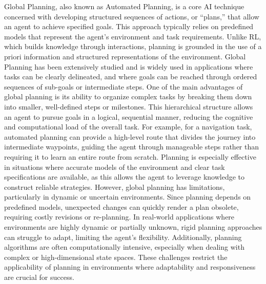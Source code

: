Global Planning, also known as Automated Planning, is a core AI technique concerned with developing structured
sequences of actions, or “plans,” that allow an agent to achieve specified goals.  %
This approach typically relies on predefined models that represent the agent’s environment and task requirements.
Unlike RL, which builds knowledge through interactions, planning is grounded in the use of a priori information and
structured representations of the environment.
Global Planning has been extensively studied and is widely used in applications where tasks can be clearly delineated,
and where goals can be reached through ordered sequences of sub-goals or intermediate steps.  %
One of the main advantages of global planning is its ability to organize complex tasks by breaking them down into
smaller, well-defined steps or milestones.
This hierarchical structure allows an agent to pursue goals in a logical, sequential manner, reducing the cognitive
and computational load of the overall task.
For example, for a navigation task, automated planning can provide a high-level route that divides the journey into intermediate
waypoints, guiding the agent through manageable steps rather than requiring it to learn an entire route from scratch.
Planning is especially effective in situations where accurate models of the environment and clear task specifications
are available, as this allows the agent to leverage knowledge to construct reliable strategies.
However, global planning has limitations, particularly in dynamic or uncertain environments.
Since planning depends on predefined models, unexpected changes can quickly render a plan obsolete, requiring costly
revisions or re-planning.
In real-world applications where environments are highly dynamic or partially unknown, rigid planning approaches can
struggle to adapt, limiting the agent’s flexibility.
Additionally, planning algorithms are often computationally intensive, especially when dealing with complex or
high-dimensional state spaces.
These challenges restrict the applicability of planning in environments where adaptability and responsiveness are
crucial for success.

